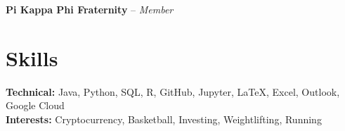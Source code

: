 \documentclass[11pt]{article}
\begin{document}
\vspace{0.1em}

\begin{adjustwidth}{0.5em}{0em}
\textbf{Pi Kappa Phi Fraternity} -- \textit{Member}
\end{adjustwidth}

\vspace{0.1em}


\section*{Skills}
\textbf{Technical:} Java, Python, SQL, R, GitHub, Jupyter, LaTeX, Excel, Outlook, Google Cloud\\ 
\textbf{Interests:} Cryptocurrency, Basketball, Investing, Weightlifting, Running 
\end{document}
